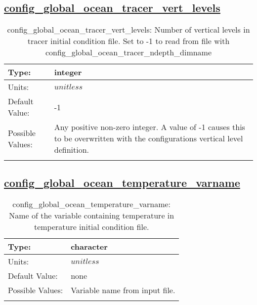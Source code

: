 \subsection[config\_global\_ocean\_tracer\_vert\_levels]{\hyperref[sec:nm_tab_global_ocean]{config\_global\_ocean\_tracer\_vert\_levels}}
\label{subsec:nm_sec_config_global_ocean_tracer_vert_levels}
\begin{center}
\begin{longtable}{| p{2.0in} || p{4.0in} |}
    \hline
    Type: & integer \\
    \hline
    Units: & $unitless$ \\
    \hline
    Default Value: & -1 \\
    \hline
    Possible Values: & Any positive non-zero integer. A value of -1 causes this to be overwritten with the configurations vertical level definition. \\
    \hline
    \caption{config\_global\_ocean\_tracer\_vert\_levels: Number of vertical levels in tracer initial condition file.  Set to -1 to read from file with config\_global\_ocean\_tracer\_ndepth\_dimname}
\end{longtable}
\end{center}
\subsection[config\_global\_ocean\_temperature\_varname]{\hyperref[sec:nm_tab_global_ocean]{config\_global\_ocean\_temperature\_varname}}
\label{subsec:nm_sec_config_global_ocean_temperature_varname}
\begin{center}
\begin{longtable}{| p{2.0in} || p{4.0in} |}
    \hline
    Type: & character \\
    \hline
    Units: & $unitless$ \\
    \hline
    Default Value: & none \\
    \hline
    Possible Values: & Variable name from input file. \\
    \hline
    \caption{config\_global\_ocean\_temperature\_varname: Name of the variable containing temperature in temperature initial condition file.}
\end{longtable}
\end{center}
